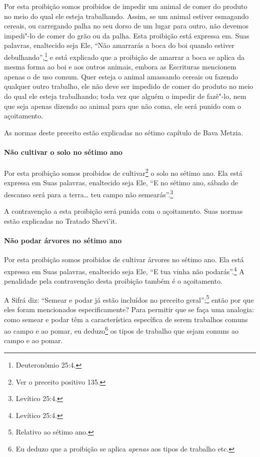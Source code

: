 \begin{multicols}{2}
Por esta proibição somos proibidos de impedir um animal de comer do
produto no meio do qual ele esteja trabalhando. Assim, se um animal
estiver esmagando cereais, ou carregando palha no seu dorso de um lugar
para outro, não devemos impedi"-lo de comer do grão ou da palha. Esta
proibição está expressa em. Suas palavras, enaltecido seja Ele, ``Não
amarrarás a boca do boi quando estiver debulhando'',\footnote{Deuteronômio 25:4.}
e está explicado que a proibição de amarrar a boca se aplica da mesma
forma ao boi e aos outros animais, embora as Escrituras mencionem apenas
o de uso comum. Quer esteja o animal amassando cereais ou fazendo
qualquer outro trabalho, ele não deve ser impedido de comer do produto
no meio do qual ele esteja trabalhando; toda vez que alguém o impedir de
fazê"-lo, nem que seja apenas dizendo ao animal para que não coma, ele
será punido com o açoitamento.

As normas deste preceito estão explicadas no sétimo capítulo de Bava Metzia\starr.

\paragraph{Não cultivar o solo no sétimo ano}

Por esta proibição somos proibidos de cultivar\footnote{Ver o preceito positivo 135.} o
solo no sétimo ano. Ela está expressa em Suas palavras, enaltecido seja
Ele, ``E no sétimo ano, sábado de descanso será para a terra\ldots{} teu
campo não semearás''.\footnote{Levítico 25:4.}

A contravenção a esta proibição será punida com o açoitamento. Suas
normas estão explicadas no Tratado Shevi'it\starr.


\paragraph{Não podar árvores no sétimo ano}

Por esta proibição somos proibidos de cultivar árvores no sétimo ano.
Ela está expressa em Suas palavras, enaltecido seja Ele, ``E tua vinha
não podarás''.\footnote{Levítico 25:4.} A penalidade pela contravenção desta
proibição também é o açoitamento.

A Sifrá\starr{} diz: ``Semear e podar já estão incluídos no preceito
geral'';\footnote{Relativo ao sétimo ano.} então por que eles foram mencionados
especificamente? Para permitir que se faça uma analogia: como semear e
podar têm a característica específica de serem trabalhos comuns ao
campo e ao pomar, eu deduzo\footnote{Eu deduzo que a proibição se aplica \emph{apenas} aos tipos de trabalho etc.} os tipos de trabalho
que sejam comuns ao campo e ao pomar.


\end{multicols}
